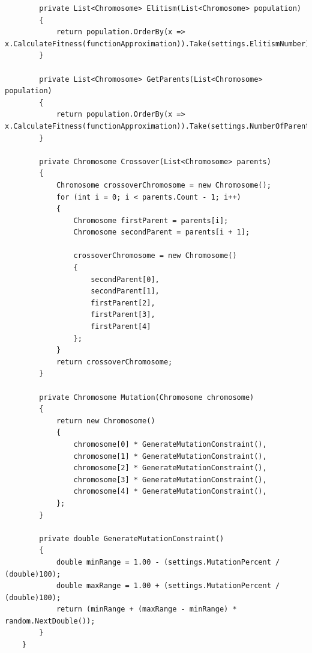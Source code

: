 \documentclass{article}
\begin{document}
\begin{lstlisting}
        private List<Chromosome> Elitism(List<Chromosome> population)
        {
            return population.OrderBy(x => x.CalculateFitness(functionApproximation)).Take(settings.ElitismNumber).ToList();
        }

        private List<Chromosome> GetParents(List<Chromosome> population)
        {
            return population.OrderBy(x => x.CalculateFitness(functionApproximation)).Take(settings.NumberOfParents).ToList();
        }

        private Chromosome Crossover(List<Chromosome> parents)
        {
            Chromosome crossoverChromosome = new Chromosome();
            for (int i = 0; i < parents.Count - 1; i++)
            {
                Chromosome firstParent = parents[i];
                Chromosome secondParent = parents[i + 1];
                
                crossoverChromosome = new Chromosome()
                {
                    secondParent[0],
                    secondParent[1],
                    firstParent[2],
                    firstParent[3],
                    firstParent[4]
                };
            }
            return crossoverChromosome;
        }

        private Chromosome Mutation(Chromosome chromosome)
        {
            return new Chromosome()
            {
                chromosome[0] * GenerateMutationConstraint(),
                chromosome[1] * GenerateMutationConstraint(),
                chromosome[2] * GenerateMutationConstraint(),
                chromosome[3] * GenerateMutationConstraint(),
                chromosome[4] * GenerateMutationConstraint(),
            };
        }
        
        private double GenerateMutationConstraint()
        {
            double minRange = 1.00 - (settings.MutationPercent / (double)100);
            double maxRange = 1.00 + (settings.MutationPercent / (double)100);
            return (minRange + (maxRange - minRange) * random.NextDouble());
        }
    }
    \end{lstlisting}
\end{document}
